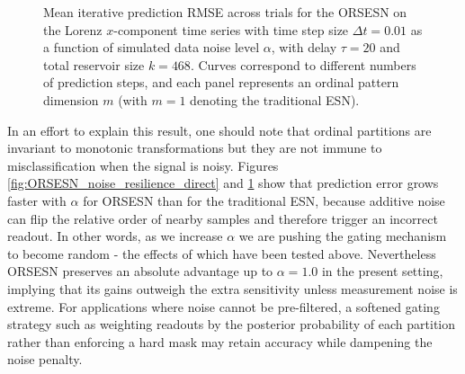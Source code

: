 \begin{figure}
    \centering
    \caption{Mean iterative prediction RMSE across trials for the ORSESN on the Lorenz $x$-component time series with time step size $\Delta t=0.01$ as a function of simulated data noise level $\alpha$, with delay $\tau=20$ and total reservoir size $k=468$. Curves correspond to different numbers of prediction steps, and each panel represents an ordinal pattern dimension $m$ (with $m=1$ denoting the traditional ESN).}
    \label{fig:ORSESN_noise_resilience_iterative}
\end{figure}

In an effort to explain this result, one should note that ordinal partitions are invariant to monotonic transformations but they are not immune to misclassification when the signal is noisy. Figures \ref{fig:ORSESN_noise_resilience_direct} and \ref{fig:ORSESN_noise_resilience_iterative} show that prediction error grows faster with $\alpha$ for ORSESN than for the traditional ESN, because additive noise can flip the relative order of nearby samples and therefore trigger an incorrect readout. In other words, as we increase $\alpha$ we are pushing the gating mechanism to become random - the effects of which have been tested above. Nevertheless ORSESN preserves an absolute advantage up to $\alpha=1.0$ in the present setting, implying that its gains outweigh the extra sensitivity unless measurement noise is extreme. For applications where noise cannot be pre-filtered, a softened gating strategy such as weighting readouts by the posterior probability of each partition rather than enforcing a hard mask may retain accuracy while dampening the noise penalty.



